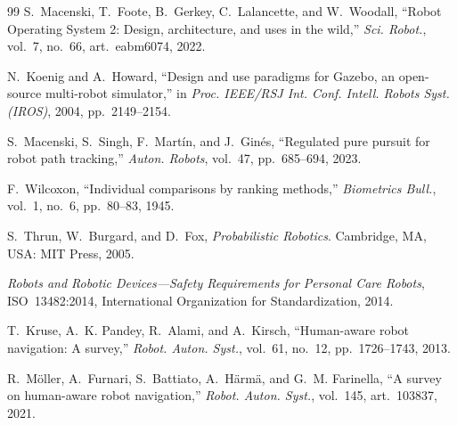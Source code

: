\documentclass[conference]{IEEEtran}
\begin{document}
\begin{thebibliography}{99}
S.~Macenski, T.~Foote, B.~Gerkey, C.~Lalancette, and W.~Woodall, ``Robot Operating System 2: Design, architecture, and uses in the wild,'' \emph{Sci. Robot.}, vol.~7, no.~66, art.~eabm6074, 2022.

N.~Koenig and A.~Howard, ``Design and use paradigms for Gazebo, an open-source multi-robot simulator,'' in \emph{Proc. IEEE/RSJ Int. Conf. Intell. Robots Syst. (IROS)}, 2004, pp.~2149--2154.

S.~Macenski, S.~Singh, F.~Mart\'in, and J.~Gin\'es, ``Regulated pure pursuit for robot path tracking,'' \emph{Auton. Robots}, vol.~47, pp.~685--694, 2023.

F.~Wilcoxon, ``Individual comparisons by ranking methods,'' \emph{Biometrics Bull.}, vol.~1, no.~6, pp.~80--83, 1945.

S.~Thrun, W.~Burgard, and D.~Fox, \emph{Probabilistic Robotics}. Cambridge, MA, USA: MIT Press, 2005.

\emph{Robots and Robotic Devices---Safety Requirements for Personal Care Robots}, ISO~13482:2014, International Organization for Standardization, 2014.

T.~Kruse, A.~K. Pandey, R.~Alami, and A.~Kirsch, ``Human-aware robot navigation: A survey,'' \emph{Robot. Auton. Syst.}, vol.~61, no.~12, pp.~1726--1743, 2013.

R.~M\"oller, A.~Furnari, S.~Battiato, A.~H\"arm\"a, and G.~M. Farinella, ``A survey on human-aware robot navigation,'' \emph{Robot. Auton. Syst.}, vol.~145, art.~103837, 2021.
\end{thebibliography}
\end{document}
